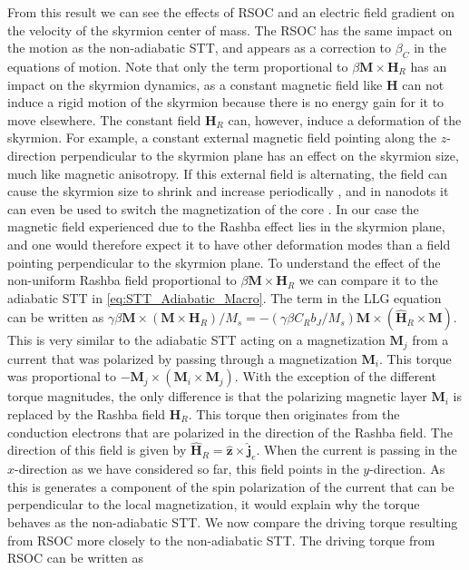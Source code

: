 From this result we can see the effects of RSOC and an electric field gradient on the velocity of the skyrmion center of mass. The RSOC has the same impact on the motion as the non-adiabatic STT, and appears as a correction to $\beta_C$ in the equations of motion. Note that only the term proportional to $\beta\mathbold{M}\times\mathbold{H}_R$ has an impact on the skyrmion dynamics, as a constant magnetic field like $\mathbold{H}$ can not induce a rigid motion of the skyrmion because there is no energy gain for it to move elsewhere. The constant field $\mathbold{H}_R$ can, however, induce a deformation of the skyrmion. For example, a constant external magnetic field pointing along the $z$-direction perpendicular to the skyrmion plane has an effect on the skyrmion size, much like magnetic anisotropy. If this external field is alternating, the field can cause the skyrmion size to shrink and increase periodically \cite{Mochizuki2012}, and in nanodots it can even be used to switch the magnetization of the core \cite{Zhang2015}. In our case the magnetic field experienced due to the Rashba effect lies in the skyrmion plane, and one would therefore expect it to have other deformation modes than a field pointing perpendicular to the skyrmion plane. To understand the effect of the non-uniform Rashba field proportional to $\beta\mathbold{M}\times\mathbold{H}_R$ we can compare it to the adiabatic STT in \eqref{eq:STT_Adiabatic_Macro}. The term in the LLG equation can be written as $\gamma\beta\mathbold{M}\times(\mathbold{M}\times\mathbold{H}_R)/M_s = -(\gamma\beta C_R b_J/M_s)\mathbold{M}\times(\mathbold{\hat{H}}_R\times\mathbold{M})$. This is very similar to the adiabatic STT acting on a magnetization $\mathbold{M}_j$ from a current that was polarized by passing through a magnetization $\mathbold{M}_i$. This torque was proportional to $-\mathbold{M}_j\times(\mathbold{M}_i\times\mathbold{M}_j)$. With the exception of the different torque magnitudes, the only difference is that the polarizing magnetic layer $\mathbold{M}_i$ is replaced by the Rashba field $\mathbold{H}_R$. This torque then originates from the conduction electrons that are polarized in the direction of the Rashba field. The direction of this field is given by $\mathbold{\hat{H}}_R=\mathbold{\hat{z}}\times\mathbold{\hat{j}}_e$. When the current is passing in the $x$-direction as we have considered so far, this field points in the $y$-direction. As this is generates a component of the spin polarization of the current that can be perpendicular to the local magnetization, it would explain why the torque behaves as the non-adiabatic STT. We now compare the driving torque resulting from RSOC more closely to the non-adiabatic STT. The driving torque from RSOC can be written as
